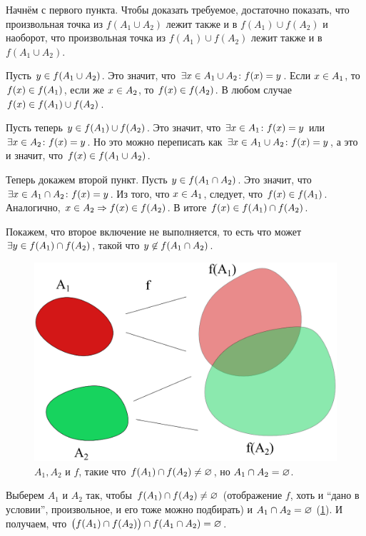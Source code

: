 \documentclass[a4paper,12pt]{article}
\begin{document}
  \begin{solution}
    Начнём с первого пункта.
    Чтобы доказать требуемое, достаточно показать, что произвольная точка из $f(A_1 \cup A_2)$ лежит также и в $f(A_1) \cup f(A_2)$ и наоборот, что произвольная точка из $f(A_1) \cup f(A_2)$ лежит также и в $f(A_1 \cup A_2)$.
    
    Пусть $y \hm\in f(A_1 \cup A_2)$.
    Это значит, что $\exists x \hm\in A_1 \hm\cup A_2\colon f(x) \hm= y$.
    Если $x \hm\in A_1$, то $f(x) \hm\in f(A_1)$, если же $x \hm\in A_2$, то $f(x) \hm\in f(A_2)$.
    В любом случае $f(x) \hm\in f(A_1) \hm\cup f(A_2)$.
    
    Пусть теперь $y \hm\in f(A_1) \hm\cup f(A_2)$.
    Это значит, что $\exists x \hm\in A_1\colon f(x) \hm= y$ или $\exists x \hm\in A_2\colon f(x) \hm= y$.
    Но это можно переписать как $\exists x \hm\in A_1 \hm\cup A_2\colon f(x) \hm= y$, а это и значит, что $f(x) \hm\in f(A_1 \cup A_2)$.
    
    \bigskip
    
    Теперь докажем второй пункт.
    Пусть $y \hm\in f(A_1 \cap A_2)$.
    Это значит, что $\exists x \hm\in A_1 \hm\cap A_2\colon f(x) \hm= y$.
    Из того, что $x \hm\in A_1$, следует, что $f(x) \hm\in f(A_1)$.
    Аналогично, $x \hm\in A_2 \hm\Rightarrow f(x) \hm\in f(A_2)$.
    В итоге $f(x) \hm\in f(A_1) \hm\cap f(A_2)$.
    
    Покажем, что второе включение не выполняется, то есть что может $\exists y \hm\in f(A_1) \hm\cap f(A_2)$, такой что $y \hm{\not\in} f(A_1 \cap A_2)$.

    \begin{figure}
      \centering
      
      \includegraphics[width=0.8\columnwidth]{cap-not-cap}
      
      \caption{$A_1, A_2$ и $f$, такие что $f(A_1) \hm\cap f(A_2) \hm{\not=} \noth$, но $A_1 \hm\cap A_2 \hm= \noth$.}
      \label{fig:cap-not-cap}
    \end{figure}

    Выберем $A_1$ и $A_2$ так, чтобы $f(A_1) \hm\cap f(A_2) \hm{\not=} \noth$ (отображение $f$, хоть и ``дано в условии'', произвольное, и его тоже можно подбирать) и $A_1 \hm\cap A_2 \hm= \noth$ (\ref{fig:cap-not-cap}).
    И получаем, что $\bigl(f(A_1) \hm\cap f(A_2)\bigr) \hm\cap f(A_1 \cap A_2) \hm= \noth$.
  \end{solution}
  
\end{document}
